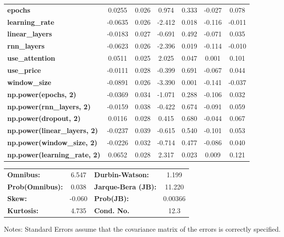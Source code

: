 \begin{center}
\begin{tabular}{lcccccc}
\textbf{epochs}                            &       0.0255  &        0.026     &     0.974  &         0.333        &       -0.027    &        0.078     \\
\textbf{learning\_rate}                    &      -0.0635  &        0.026     &    -2.412  &         0.018        &       -0.116    &       -0.011     \\
\textbf{linear\_layers}                    &      -0.0183  &        0.027     &    -0.691  &         0.492        &       -0.071    &        0.035     \\
\textbf{rnn\_layers}                       &      -0.0623  &        0.026     &    -2.396  &         0.019        &       -0.114    &       -0.010     \\
\textbf{use\_attention}                    &       0.0511  &        0.025     &     2.025  &         0.047        &        0.001    &        0.101     \\
\textbf{use\_price}                        &      -0.0111  &        0.028     &    -0.399  &         0.691        &       -0.067    &        0.044     \\
\textbf{window\_size}                      &      -0.0891  &        0.026     &    -3.390  &         0.001        &       -0.141    &       -0.037     \\
\textbf{np.power(epochs, 2)}               &      -0.0369  &        0.034     &    -1.071  &         0.288        &       -0.106    &        0.032     \\
\textbf{np.power(rnn\_layers, 2)}          &      -0.0159  &        0.038     &    -0.422  &         0.674        &       -0.091    &        0.059     \\
\textbf{np.power(dropout, 2)}              &       0.0116  &        0.028     &     0.415  &         0.680        &       -0.044    &        0.067     \\
\textbf{np.power(linear\_layers, 2)}       &      -0.0237  &        0.039     &    -0.615  &         0.540        &       -0.101    &        0.053     \\
\textbf{np.power(window\_size, 2)}         &      -0.0226  &        0.032     &    -0.714  &         0.477        &       -0.086    &        0.040     \\
\textbf{np.power(learning\_rate, 2)}       &       0.0652  &        0.028     &     2.317  &         0.023        &        0.009    &        0.121     \\
\bottomrule
\end{tabular}
\begin{tabular}{lclc}
\textbf{Omnibus:}       &  6.547 & \textbf{  Durbin-Watson:     } &    1.199  \\
\textbf{Prob(Omnibus):} &  0.038 & \textbf{  Jarque-Bera (JB):  } &   11.220  \\
\textbf{Skew:}          & -0.060 & \textbf{  Prob(JB):          } &  0.00366  \\
\textbf{Kurtosis:}      &  4.735 & \textbf{  Cond. No.          } &     12.3  \\
\bottomrule
\end{tabular}
\end{center}

Notes: \newline
 [1] Standard Errors assume that the covariance matrix of the errors is correctly specified.
